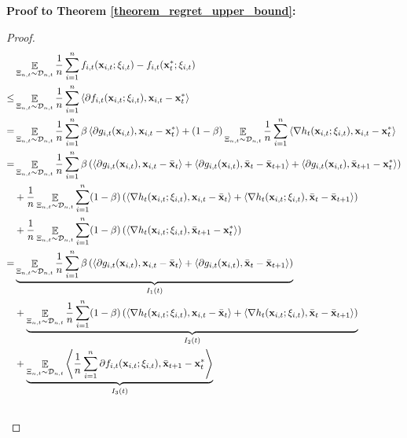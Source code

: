 \documentclass{article}
\begin{document}
\textbf{Proof to Theorem \ref{theorem_regret_upper_bound}:}
\begin{proof}
\begin{align}
\nonumber
& \mathop{\mathbb{E}}_{ \Xi_{n,t} \sim \mathcal{D}_{n,t} } \frac{1}{n}\sum_{i=1}^n f_{i,t}({\bf x}_{i,t};\xi_{i,t}) - f_{i,t}({\bf x}_t^\ast;\xi_{i,t}) \\ \nonumber
\le & \mathop{\mathbb{E}}_{ \Xi_{n,t} \sim \mathcal{D}_{n,t} } \frac{1}{n}\sum_{i=1}^n \left\langle \partial f_{i,t}({\bf x}_{i,t};\xi_{i,t}),  {\bf x}_{i,t} - {\bf x}_t^\ast  \right\rangle \\ \nonumber
= & \mathop{\mathbb{E}}_{ \Xi_{n,t} \sim \mathcal{D}_{n,t} }\frac{1}{n}\sum_{i=1}^n \beta \left\langle\partial g_{i,t}({\bf x}_{i,t}), {\bf x}_{i,t} - {\bf x}_t^\ast  \right\rangle + (1-\beta) \mathop{\mathbb{E}}_{ \Xi_{n,t} \sim \mathcal{D}_{n,t} } \frac{1}{n}\sum_{i=1}^n \left\langle\nabla h_t({\bf x}_{i,t};\xi_{i,t}), {\bf x}_{i,t} - {\bf x}_t^\ast  \right\rangle \\ \nonumber
 = & \mathop{\mathbb{E}}_{ \Xi_{n,t} \sim \mathcal{D}_{n,t} }\frac{1}{n}\sum_{i=1}^n \beta \left( \left\langle\partial g_{i,t}({\bf x}_{i,t}), {\bf x}_{i,t} - \bar{{\bf x}}_t  \right\rangle + \left\langle\partial g_{i,t}({\bf x}_{i,t}), \bar{{\bf x}}_t - \bar{{\bf x}}_{t+1} \right\rangle + \left\langle\partial g_{i,t}({\bf x}_{i,t}), \bar{{\bf x}}_{t+1} - {\bf x}_t^\ast   \right\rangle  \right) \\ \nonumber 
 & + \frac{1}{n}\mathop{\mathbb{E}}_{ \Xi_{n,t} \sim \mathcal{D}_{n,t} }\sum_{i=1}^n (1-\beta) \left(   \left\langle\nabla h_t({\bf x}_{i,t};\xi_{i,t}), {\bf x}_{i,t} - \bar{{\bf x}}_t  \right\rangle +  \left\langle\nabla h_t({\bf x}_{i,t};\xi_{i,t}), \bar{{\bf x}}_t - \bar{{\bf x}}_{t+1}  \right\rangle  \right) \\ \nonumber 
 & + \frac{1}{n}\mathop{\mathbb{E}}_{ \Xi_{n,t} \sim \mathcal{D}_{n,t} }\sum_{i=1}^n (1-\beta) \left(  \left\langle\nabla h_t({\bf x}_{i,t};\xi_{i,t}), \bar{{\bf x}}_{t+1} - {\bf x}_t^\ast  \right\rangle  \right)\\ \nonumber
= & \underbrace{ \mathop{\mathbb{E}}_{ \Xi_{n,t} \sim \mathcal{D}_{n,t} } \frac{1}{n}\sum_{i=1}^n \beta \left( \left\langle\partial g_{i,t}({\bf x}_{i,t}), {\bf x}_{i,t} - \bar{{\bf x}}_t  \right\rangle + \left\langle\partial g_{i,t}({\bf x}_{i,t}), \bar{{\bf x}}_t - \bar{{\bf x}}_{t+1}  \right\rangle  \right) }_{I_1(t)} \\ \nonumber 
 & + \underbrace{ \mathop{\mathbb{E}}_{ \Xi_{n,t} \sim \mathcal{D}_{n,t} } \frac{1}{n}\sum_{i=1}^n (1-\beta) \left(  \left\langle\nabla h_t({\bf x}_{i,t}; \xi_{i,t}), {\bf x}_{i,t} - \bar{{\bf x}}_t  \right\rangle +   \left\langle\nabla h_t({\bf x}_{i,t};\xi_{i,t}), \bar{{\bf x}}_t - \bar{{\bf x}}_{t+1}  \right\rangle \right) }_{I_2(t)}\\ \nonumber 
&+ \underbrace{ \mathop{\mathbb{E}}_{ \Xi_{n,t} \sim \mathcal{D}_{n,t} } \left\langle\frac{1}{n}\sum_{i=1}^n\partial f_{i,t}({\bf x}_{i,t};\xi_{i,t}), \bar{{\bf x}}_{t+1} - {\bf x}_t^\ast  \right\rangle }_{I_3(t)}\\ \nonumber
\end{align}


\end{proof}
\end{document}
